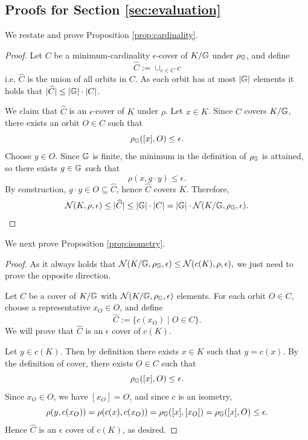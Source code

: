 \documentclass{article}
\begin{document}
\subsection{Proofs for Section \ref{sec:evaluation}}
We restate and prove Proposition \ref{prop:cardinality}.
\cardinality*
\begin{proof}
\label{upper_bound}
Let $C$ be a minimum-cardinality $\epsilon$-cover of $K/\mathbb{G}$ under $\rho_{\mathbb{G}}$, and define
\[
\widehat{C}:=\cup_{c \in C}c
\]
i.e, $\widehat{C}$ is the union of all orbits in $C$. As each orbit has at most $|\mathbb{G}|$ elements it holds that $|\widehat{C}|\le |\mathbb{G}|\cdot |C|$.

We claim that $\widehat{C}$ is an $\epsilon$-cover of $K$ under $\rho$.
Let $x\in K$. Since $C$ covers $K/\mathbb{G}$, there exists an orbit $O\in C$ such that
\[
\rho_{\mathbb{G}}([x],O)\le \epsilon.
\]
Choose $y\in O$. Since $\mathbb{G}$ is finite, the minimum in the definition of $\rho_{\mathbb{G}}$ is attained, so there exists $g\in \mathbb{G}$ such that
\[
\rho(x,g\cdot y)\le \epsilon.
\]
By construction, $g\cdot y\in O\subseteq \widehat{C}$, hence $\widehat{C}$ covers $K$.
Therefore,
\[
\mathcal{N}(K,\rho,\epsilon)
\le |\widehat{C}|
\le |\mathbb{G}|\cdot |C|
=|\mathbb{G}|\cdot \mathcal{N}(K/\mathbb{G},\rho_{\mathbb{G}},\epsilon).
\]
\end{proof}
We next prove Proposition \ref{prop:isometry}.
\isometry*
\label{Proof_isometry}
\begin{proof}
As it always holds that
\(    \mathcal{N}(K/\mathbb{G},\rho_{\mathbb{G}},\epsilon)\leq \mathcal{N}(c(K),\rho,\epsilon),
   \)
we just need to prove the opposite direction.

Let $C$ be a cover of $K/\mathbb{G}$ with $\mathcal{N}(K/\mathbb{G},\rho_{\mathbb{G}},\epsilon)$ elements. For each orbit $O\in C$, choose a representative $x_O\in O$, and define
\[
\hat{C}:=\{c(x_O)\mid O\in C\}.
\]
We will prove that $\hat{C}$ is an $\epsilon$ cover of $c(K)$.

Let $y\in c(K)$. Then by definition there exists $x\in K$ such that $y=c(x)$. By the definition of cover, there exists $O\in C$ such that
\[
\rho_{\mathbb{G}}([x],O)\leq \epsilon.
\]
Since $x_O\in O$, we have $[x_O]=O$, and since $c$ is an isometry,
\[
\rho(y,c(x_O))
=
\rho(c(x),c(x_O))
=
\rho_{\mathbb{G}}([x],[x_O])
=
\rho_{\mathbb{G}}([x],O)
\leq \epsilon.
\]
Hence $\hat{C}$ is an $\epsilon$ cover of $c(K)$, as desired.

\end{proof}
\end{document}
